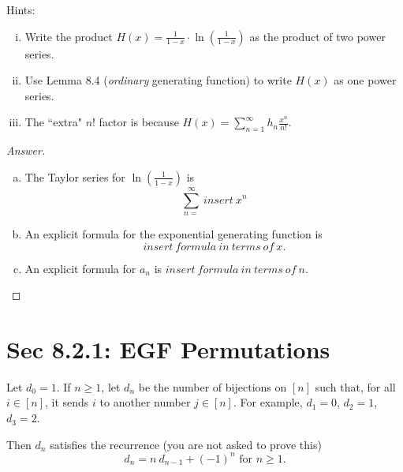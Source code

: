 \documentclass[12pt, oneside]{amsart}
\begin{document}
\begin{enumerate}[a.]
	{\tiny \noindent Hints: 
	 \begin{enumerate}[i.]  \item Write the product  $H(x)= \frac{1}{1-x} \cdot  \ln\left(\frac{1}{1-x}\right)$ as the product of two power series. \item Use Lemma 8.4  (\emph{ordinary} generating function) to write $H(x)$ as one power series.  \item The ``extra" $n!$ factor is because $H(x)=\sum_{n=1}^\infty h_n \frac{x^n}{n!}$. \end{enumerate}}
	
\end{enumerate}

\begin{proof}[Answer]
	\begin{enumerate}[a.]
		\item The Taylor series for $\ln\left(\frac{1}{1-x}\right)$  is \begin{equation*}
		\boxed{ \sum_{n=}^\infty ~ insert ~ x^n}
		\end{equation*}
		
		\item 
		An explicit formula for the exponential generating function is 
		\begin{equation*}
		\boxed{insert ~ formula ~ in ~ terms ~ of ~ x}.
		\end{equation*}
		
		
		\item
		An explicit formula for $a_n$ is $\boxed{insert ~ formula ~ in ~ terms ~ of ~ n}$.
	
	\end{enumerate}
\end{proof}



\section{Sec 8.2.1: EGF 
	Permutations
}

Let $d_0=1$. If $n \geq 1$, let $d_n$ be the number of bijections on $[n]$ such that, for all $i\in [n]$, it sends $i$ to another number $j\in [n]$. 
For example, $d_1=0$, $d_2=1$, $d_3=2$.


Then $d_n$ satisfies the recurrence (you are not asked to prove this) 
\begin{equation}
\label{eq:dn}
d_n = n ~ d_{n-1} + (-1)^n \text{ for } n \geq 1.
\end{equation}
\end{document}

